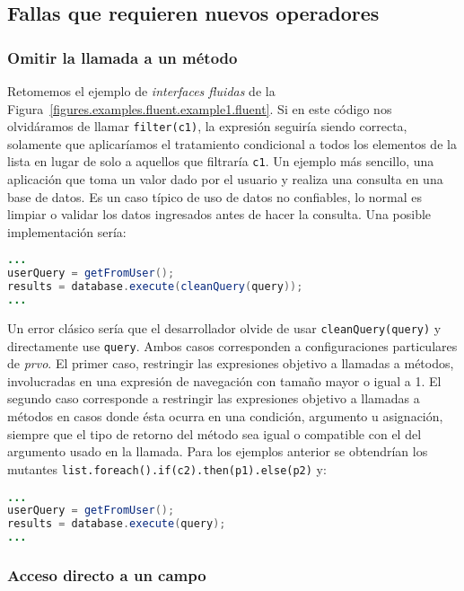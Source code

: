 \subsection{Fallas que requieren nuevos operadores}

\subsubsection{Omitir la llamada a un m\'etodo}

Retomemos el ejemplo de \emph{interfaces fluidas} de la Figura~\ref{figures.examples.fluent.example1.fluent}. Si en este c\'odigo nos olvid\'aramos de llamar \texttt{filter(c1)}, la expresi\'on seguir\'ia siendo correcta, solamente que aplicar\'iamos el tratamiento condicional a todos los elementos de la lista en lugar de solo a aquellos que filtrar\'ia \texttt{c1}. Un ejemplo m\'as sencillo, una aplicaci\'on que toma un valor dado por el usuario y realiza una consulta en una base de datos. Es un caso t\'ipico de uso de datos no confiables, lo normal es limpiar o validar los datos ingresados antes de hacer la consulta. Una posible implementaci\'on ser\'ia:
\begin{lstlisting}[language=Java,basicstyle={}]
...
userQuery = getFromUser();
results = database.execute(cleanQuery(query));
...
\end{lstlisting}
Un error cl\'asico ser\'ia que el desarrollador olvide de usar \texttt{cleanQuery(query)} y directamente use \texttt{query}. Ambos casos corresponden a configuraciones particulares de \emph{prvo}. El primer caso, restringir las expresiones objetivo a llamadas a m\'etodos, involucradas en una expresi\'on de navegaci\'on con tama\~no mayor o igual a 1. El segundo caso corresponde a restringir las expresiones objetivo a llamadas a m\'etodos en casos donde \'esta ocurra en una condici\'on, argumento u asignaci\'on, siempre que el tipo de retorno del m\'etodo sea igual o compatible con el del argumento usado en la llamada. Para los ejemplos anterior se obtendr\'ian los mutantes \lstinline{list.foreach().if(c2).then(p1).else(p2)} y:
\begin{lstlisting}[language=Java,basicstyle={}]
...
userQuery = getFromUser();
results = database.execute(query);
...
\end{lstlisting}

\subsubsection{Acceso directo a un campo}

